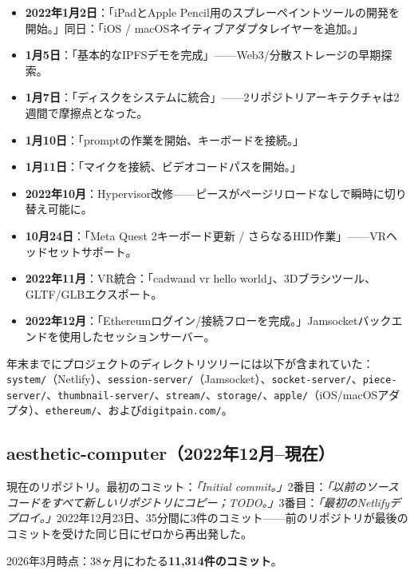 \documentclass[10pt,letterpaper,twocolumn]{article}
\begin{document}
\begin{itemize}
  \item \textbf{2022年1月2日}：「iPadとApple Pencil用のスプレーペイントツールの開発を開始。」同日：「iOS / macOSネイティブアダプタレイヤーを追加。」
  \item \textbf{1月5日}：「基本的なIPFSデモを完成」——Web3/分散ストレージの早期探索。
  \item \textbf{1月7日}：「ディスクをシステムに統合」——2リポジトリアーキテクチャは2週間で摩擦点となった。
  \item \textbf{1月10日}：「promptの作業を開始、キーボードを接続。」
  \item \textbf{1月11日}：「マイクを接続、ビデオコードパスを開始。」
  \item \textbf{2022年10月}：Hypervisor改修——ピースがページリロードなしで瞬時に切り替え可能に。
  \item \textbf{10月24日}：「Meta Quest 2キーボード更新 / さらなるHID作業」——VRヘッドセットサポート。
  \item \textbf{2022年11月}：VR統合：「cadwand vr hello world」、3Dブラシツール、GLTF/GLBエクスポート。
  \item \textbf{2022年12月}：「Ethereumログイン/接続フローを完成。」Jamsocketバックエンドを使用したセッションサーバー。
\end{itemize}

年末までにプロジェクトのディレクトリツリーには以下が含まれていた：\texttt{system/}（Netlify）、\texttt{session-server/}（Jamsocket）、\texttt{socket-server/}、\texttt{piece-server/}、\texttt{thumbnail-server/}、\texttt{stream/}、\texttt{storage/}、\texttt{apple/}（iOS/macOSアダプタ）、\texttt{ethereum/}、および\texttt{digitpain.com/}。

\subsection{aesthetic-computer（2022年12月--現在）}

現在のリポジトリ。最初のコミット：\emph{「Initial commit。」}2番目：\emph{「以前のソースコードをすべて新しいリポジトリにコピー；TODO。」}3番目：\emph{「最初のNetlifyデプロイ。」}2022年12月23日、35分間に3件のコミット——前のリポジトリが最後のコミットを受けた同じ日にゼロから再出発した。

2026年3月時点：38ヶ月にわたる\textbf{11,314件のコミット}。
\end{document}
